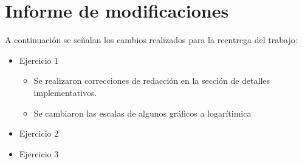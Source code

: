 \section{Informe de modificaciones}

A continuación se señalan los cambios realizados para la reentrega del trabajo:

\begin{itemize}
	\item{
		Ejercicio 1
		\begin{itemize}
			\item Se realizaron correcciones de redacción en la sección de detalles implementativos.
			\item Se cambiaron las escalas de algunos gráficos a logarítimica
		\end{itemize}
	}
	\item{
		Ejercicio 2
		\begin{itemize}
		\end{itemize}
	}
	\item{
		Ejercicio 3
		\begin{itemize}
		\end{itemize}
	}
\end{itemize}
